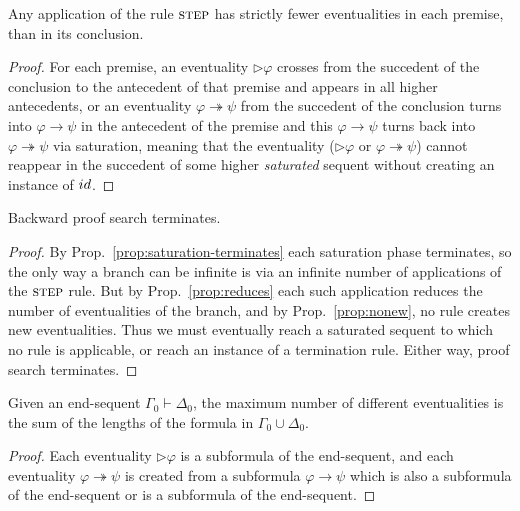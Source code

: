 \documentclass[envcountsect,envcountsame]{llncs}
\newcommand{\iimp}{\twoheadrightarrow}
\newcommand{\limp}{\rightarrow}
\newcommand{\nxt}{\rhd}
\newcommand{\seq}{\vdash}
\newcommand{\idrulename}{\small id}
\newcommand{\steprulename}{\textsc{step}}
\begin{document}
\begin{proposition}\label{prop:reduces}
  Any application of the rule $\steprulename$ has strictly fewer eventualities in each
  premise, than in its conclusion.
\end{proposition}
\begin{proof}
  For each premise, an
  eventuality $\nxt\varphi$ crosses from the succedent of the
  conclusion to the antecedent of that premise and appears in all
  higher antecedents, or an eventuality $\varphi\iimp\psi$ from the
  succedent of the conclusion turns into $\varphi\limp\psi$ in the
  antecedent of the premise and this $\varphi\limp\psi$ 
turns back into $\varphi\iimp\psi$ via saturation, meaning that the
  eventuality ($\nxt\varphi$ or $\varphi\iimp\psi$) cannot reappear in
  the succedent of some higher {\em saturated} sequent without creating an instance of $\idrulename$.
\end{proof}





\begin{theorem}
 Backward proof search terminates.
\end{theorem}

\begin{proof}
  By Prop.~\ref{prop:saturation-terminates} each saturation
  phase terminates, so the only way a branch can be infinite is
  via an infinite number of applications of the $\steprulename$
  rule. But by Prop.~\ref{prop:reduces} each such application
  reduces the number of eventualities of the branch, and by
  Prop.~\ref{prop:nonew}, no rule creates new eventualities.
Thus we must eventually reach a saturated sequent to which no rule
  is applicable, or reach an instance of a termination rule. Either
  way, proof search terminates.
\end{proof}

\begin{proposition}
  Given an end-sequent $\Gamma_0 \seq \Delta_0$, the maximum number of
  different eventualities is the sum of the lengths of the formula in
  $\Gamma_0 \cup \Delta_0$.
\end{proposition}
\begin{proof}
  Each eventuality $\nxt\varphi$ is a
  subformula of the end-sequent, and each eventuality
  $\varphi\iimp\psi$ is created from a subformula $\varphi\limp\psi$
  which is also a subformula of the end-sequent or is a subformula of
  the end-sequent.
\end{proof}
\end{document}
